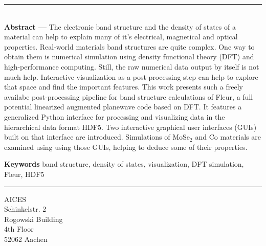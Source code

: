 \clearpage


\thispagestyle{empty}

\vspace*{\fill}
\noindent\rule[2pt]{\textwidth}{0.5pt}\\
{\textbf{Abstract ---}}
The electronic band structure and the density of states
of a material can help to explain many of it's electrical, magnetical and
optical properties. Real-world materials band structures are quite complex. One
way to obtain them is numerical simulation using density functional theory (DFT)
and high-performance computing. Still, the raw numerical data output by itself
is not much help. Interactive visualization as a post-processing step can help
to explore that space and find the important features. This work presents such a
freely availabe post-processing pipeline for band structure calculations of
Fleur, a full potential linearized augmented planewave code based on DFT. It
features a generalized Python interface for processing and visualizing data in the
hierarchical data format HDF5. Two interactive graphical user interfaces (GUIs) built
on that interface are introduced. Simulations of $\textrm{MoSe}_2$ and
$\textrm{Co}$ materials are examined using using those GUIs, helping to deduce
some of their properties.


{\textbf{Keywords}}
band structure, density of states, visualization, DFT simulation, Fleur, HDF5
\\


\noindent\rule[2pt]{\textwidth}{0.5pt}
\begin{center}
    AICES\\
    Schinkelstr. 2\\
    Rogowski Building\\
    4th Floor\\
    52062 Aachen    
\end{center}
\vspace*{\fill}

